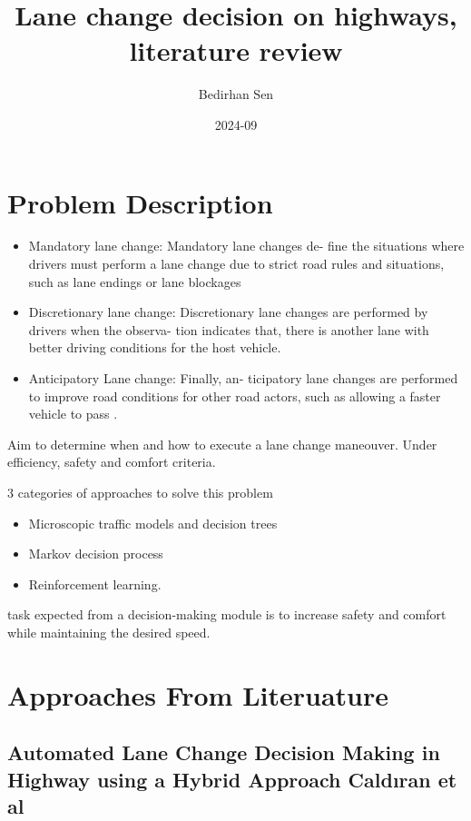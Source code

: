 \documentclass{article}
\title{Lane change decision on highways, literature review}
\date{2024-09}
\author{Bedirhan Sen}
\begin{document}
  \maketitle
  \newpage
  
  \section{Problem Description}
  \begin{itemize}
\item Mandatory lane change: Mandatory lane changes de-
fine the situations where drivers must perform a lane
change due to strict road rules and situations, such as
lane endings or lane blockages
\item Discretionary lane change: Discretionary lane
changes are performed by drivers when the observa-
tion indicates that, there is another lane with better
driving conditions for the host vehicle. 
\item Anticipatory Lane change: Finally, an-
ticipatory lane changes are performed to improve road conditions for other road actors, such as allowing a faster vehicle to pass .
\end{itemize}

Aim to determine when and how to execute a lane change maneouver. Under efficiency, safety and comfort criteria. 

3 categories of approaches to solve this problem
\begin{itemize}
\item Microscopic traffic models and decision trees
\item Markov decision process
\item Reinforcement learning. 
\end{itemize} 

task expected
from a decision-making module is to increase safety
and comfort while maintaining the desired speed.

  \section{Approaches From Literuature}
  
  \subsection{Automated Lane Change Decision Making in Highway using a Hybrid
Approach Caldıran et al}
\end{document}
